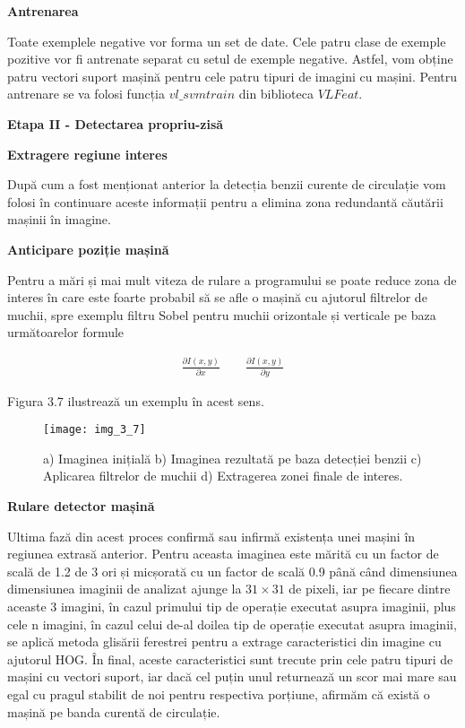 \textbf{Antrenarea}

Toate exemplele negative vor forma un set de date. Cele patru clase de exemple pozitive vor fi antrenate separat cu setul de exemple negative. Astfel, vom obține patru vectori suport mașină pentru cele patru tipuri de imagini cu mașini. 
Pentru antrenare se va folosi funcția $vl\_svmtrain$ din biblioteca $VLFeat$.

\textbf{Etapa II - Detectarea propriu-zisă}

\textbf{Extragere regiune interes}

După cum a fost menționat anterior la detecția benzii curente de circulație vom folosi în continuare aceste informații pentru a elimina zona redundantă căutării mașinii în imagine.

\textbf{Anticipare poziție mașină}

Pentru a mări și mai mult viteza de rulare a programului se poate reduce zona de interes în care este foarte probabil să se afle o mașină cu ajutorul filtrelor de muchii, spre exemplu filtru Sobel pentru muchii orizontale și verticale pe baza următoarelor formule

\begin{align}
	\frac{\partial I(x,y)}{\partial x}
	\quad \quad
	\frac{\partial I(x,y)}{\partial y}
\end{align}

Figura 3.7 ilustrează un exemplu în acest sens.
\begin{figure}[!h]
	\centering
	\texttt{[image: img\_3\_7]}
	\caption[Regiune interes detecție mașină]{a) Imaginea inițială b) Imaginea rezultată pe baza detecției benzii c) Aplicarea filtrelor de muchii d) Extragerea zonei finale de interes.}
\end{figure}

\textbf{Rulare detector mașină}

Ultima fază din acest proces confirmă sau infirmă existența unei mașini în regiunea extrasă anterior. Pentru aceasta imaginea este mărită cu un factor de scală de 1.2 de 3 ori și micșorată cu un factor de scală 0.9 până când dimensiunea dimensiunea imaginii de analizat ajunge la $31 \times 31$ de pixeli, iar pe fiecare dintre aceaste 3 imagini, în cazul primului tip de operație executat asupra imaginii, plus cele n imagini, în cazul celui de-al doilea tip de operație executat asupra imaginii, se aplică metoda glisării ferestrei pentru a extrage caracteristici din imagine cu ajutorul HOG. În final, aceste caracteristici sunt trecute prin cele patru tipuri de mașini cu vectori suport, iar dacă cel puțin unul returnează un scor mai mare sau egal cu pragul stabilit de noi pentru respectiva porțiune, afirmăm că există o mașină pe banda curentă de circulație.

